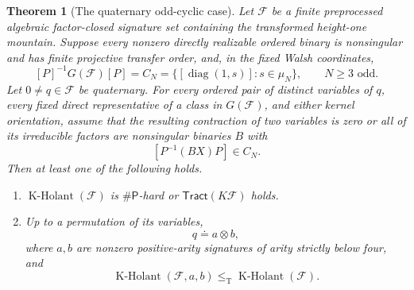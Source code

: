 \documentclass[11pt,letterpaper,onecolumn]{article}
\theoremstyle{plain}
\newtheorem{theorem}{Theorem}[section]
\theoremstyle{definition}
\theoremstyle{remark}
\newcommand{\cF}{\mathcal F}
\newcommand{\KHolant}{\operatorname{K\text{-}Holant}}
\newcommand{\Tract}{\mathsf{Tract}}
\newcommand{\SharpP}{\#\mathsf P}
\newcommand{\diag}{\operatorname{diag}}
\newcommand{\leT}{\leq_{\mathrm T}}
\begin{document}
	\begin{theorem}[The quaternary odd-cyclic case]
		\label{thm:odd-cyc-quaternary-closure}
		Let \(\cF\) be a finite preprocessed algebraic factor-closed signature
		set containing the transformed height-one mountain.  Suppose every nonzero
		directly realizable ordered binary is nonsingular and has finite projective
		transfer order, and, in the fixed Walsh coordinates,
		\[
		[P]^{-1}G(\cF)[P]
		=C_N=\{[\diag(1,s)]:s\in\mu_N\},
		\qquad N\ge3\text{ odd}.
		\]
		Let \(0\ne q\in\cF\) be quaternary.  For every ordered pair of distinct
		variables of \(q\), every fixed direct representative of a class in
		\(G(\cF)\), and either kernel orientation, assume that the resulting
		contraction of two variables is zero or all of its irreducible factors are
		nonsingular binaries \(B\) with
		\[
		[P^{-1}(BX)P]\in C_N.
		\]
		Then at least one of the following holds.
		\begin{enumerate}
			\item \(\KHolant(\cF)\) is \(\SharpP\)-hard or
			\(\Tract(K\cF)\) holds.
			\item Up to a permutation of its variables,
			\[
			q\doteq a\otimes b,
			\]
			where \(a,b\) are nonzero positive-arity signatures of arity strictly
			below four, and
			\[
			\KHolant(\cF,a,b)\leT\KHolant(\cF).
			\]
		\end{enumerate}
	\end{theorem}
	
\end{document}
